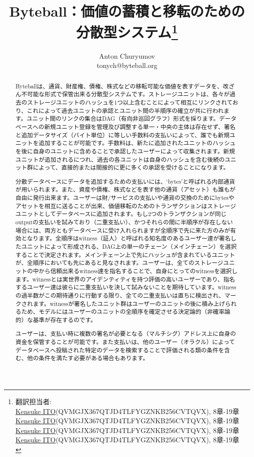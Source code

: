 \documentclass[a4paper, dvipdfmx]{jsarticle}
\title{Byteball：価値の蓄積と移転のための分散型システム\thanks{翻訳担当者: \\
     \href{http://knskito.com/}{Kensuke ITO}(QVMGJX367QTJD4TLFYGZNKB256CVTQVX), 8章-19章 \\
     \href{http://knskito.com/}{Kensuke ITO}(QVMGJX367QTJD4TLFYGZNKB256CVTQVX), 8章-19章 \\
     \href{http://knskito.com/}{Kensuke ITO}(QVMGJX367QTJD4TLFYGZNKB256CVTQVX), 8章-19章 \\
     \href{http://knskito.com/}{Kensuke ITO}(QVMGJX367QTJD4TLFYGZNKB256CVTQVX), 8章-19章 \\
     }
}
\author{Anton Churyumov\\tonych@byteball.org}
\date{}
\begin{document}
\maketitle

\begin{abstract}
Byteballは、通貨、財産権、債権、株式などの移転可能な価値を表すデータを、改ざん不可能な形式で保管出来る分散型システムです。ストレージユニットは、各々が過去のストレージユニットのハッシュを1つ以上含むことによって相互にリンクされており、これによって過去ユニットの承認とユニット間の半順序の確立が共に行われます。ユニット間のリンクの集合はDAG（有向非巡回グラフ）形式を採ります。データベースへの新規ユニット登録を管理及び調整する単一・中央の主体は存在せず、署名と追加データサイズ（バイト単位）に等しい手数料の支払いによって、誰でも新規ユニットを追加することが可能です。手数料は、新たに追加されたユニットのハッシュを後に自身のユニットに含めることで承認したユーザーによって収集されます。新規ユニットが追加されるにつれ、過去の各ユニットは自身のハッシュを含む後続のユニット群によって、直接的または間接的に更に多くの承認を受けることになります。

分散データベースにデータを追加するための支払いには、‘bytes’と呼ばれる内部通貨が用いられます。また、資産や債権、株式などを表す他の通貨（アセット）も誰もが自由に発行出来ます。ユーザーは財/サービスの支払いや通貨の交換のためにbytesやアセットを相互に送ることが出来、価値移転のためのトランザクションはストレージユニットとしてデータベースに追加されます。もし2つのトランザクションが同じoutputの支払いを試みており（二重支払い）、かつそれらの間に半順序が存在しない場合には、両方ともデータベースに受け入れられますが全順序で先に来た方のみが有効となります。全順序はwitness（証人）と呼ばれる知名度のあるユーザー達が署名したユニットによって形成される、DAG上の単一のチェーン（メインチェーン）を選択することで決定されます。メインチェーン上で先にハッシュが含まれているユニットが、全順序においても先にあると見なされます。ユーザーは、全てのストレージユニットの中から信頼出来るwitness達を指名することで、自身にとってのwitnessを選択します。witnessとは実世界のアイデンティティを持つ評価の高いユーザーであり、指名するユーザー達は彼らに二重支払いを決して試みないことを期待しています。witnessの過半数がこの期待通りに行動する限り、全ての二重支払いは直ちに検出され、マークされます。witnessが署名したユニット群はユーザーのユニットの後に積み上げられるため、モデルにはユーザーのユニットの全順序を確定させる決定論的（非確率論的）な基準が存在するのです。

ユーザーは、支払い時に複数の署名が必要となる（マルチシグ）アドレス上に自身の資金を保管することが可能です。また支払いは、他のユーザー（オラクル）によってデータベースへ投稿された特定のデータを検索することで評価される類の条件を含む、他の条件を満たす必要がある場合もあります。


\end{abstract}
\end{document}
